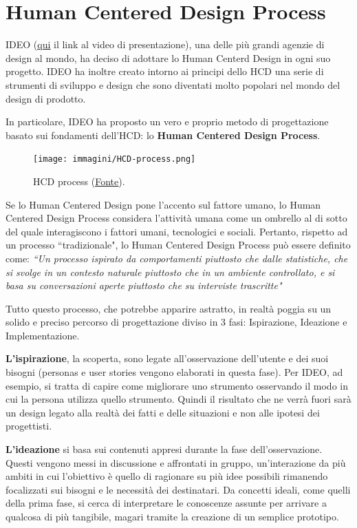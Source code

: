 \section{Human Centered Design Process}
IDEO (\href{https://vimeo.com/106505300}{\underline{qui}} il link al video di presentazione), una delle più grandi agenzie di design al mondo, ha
deciso di adottare lo Human Centerd Design in ogni suo progetto. IDEO ha inoltre creato intorno ai principi dello HCD una serie di strumenti di
sviluppo e design che sono diventati molto popolari nel mondo del design di prodotto.

In particolare, IDEO ha proposto un vero e proprio metodo di progettazione basato sui fondamenti dell'HCD: lo \textbf{Human Centered Design Process}.

\begin{figure}[!h]
	\centering
	\texttt{[image: immagini/HCD-process.png]}
	\caption{HCD process
	(\href{https://blog.movingworlds.org/human-centered-design-vs-design-thinking-how-theyre-different-and-how-to-use-them-together-to-create-lasting-change/}
	{\underline{Fonte}}).} 
	\label{hcd-process}
\end{figure}

Se lo Human Centered Design pone l'accento sul fattore umano, lo Human Centered Design Process considera l'attività umana come un ombrello al di sotto
del quale interagiscono i fattori umani, tecnologici e sociali. Pertanto, rispetto ad un processo ``tradizionale", lo Human Centered Design Process
può essere definito come: \textit{``Un processo ispirato da comportamenti piuttosto che dalle statistiche, che si svolge in un contesto naturale
piuttosto che in un ambiente controllato, e si basa su conversazioni aperte piuttosto che su interviste trascritte"}

Tutto questo processo, che potrebbe apparire astratto, in realtà poggia su un solido e preciso percorso di progettazione diviso in 3 fasi:
Ispirazione, Ideazione e Implementazione.

\textbf{L'ispirazione}, la scoperta, sono legate all'osservazione dell'utente e dei suoi bisogni (personas e user stories vengono elaborati in questa
fase). Per IDEO, ad esempio, si tratta di capire come migliorare uno strumento osservando il modo in cui la persona utilizza quello strumento.
Quindi il risultato che ne verrà fuori sarà un design legato alla realtà dei fatti e delle situazioni e non alle ipotesi dei progettisti.

\textbf{L'ideazione} si basa sui contenuti appresi durante la fase dell'osservazione. Questi vengono messi in discussione e affrontati in gruppo,
un'interazione da più ambiti in cui l'obiettivo è quello di ragionare su più idee possibili rimanendo focalizzati sui bisogni e le necessità dei
destinatari. Da concetti ideali, come quelli della prima fase, si cerca di interpretare le conoscenze assunte per arrivare a qualcosa di più
tangibile, magari tramite la creazione di un semplice prototipo. 


